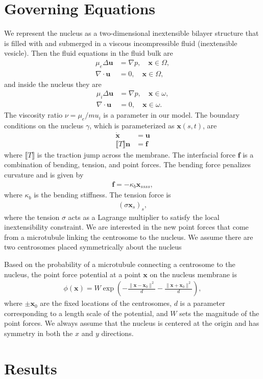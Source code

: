 \documentclass[11pt]{article}
\newcommand{\ff}{\mathbf{f}}
\newcommand{\nn}{\mathbf{n}}
\newcommand{\uu}{\mathbf{u}}
\newcommand{\xx}{\mathbf{x}}
\begin{document}
\section{Governing Equations}
We represent the nucleus as a two-dimensional inextensible bilayer
structure that is filled with and submerged in a viscous incompressible
fluid (inextensible vesicle).  Then the fluid equations in the fluid
bulk are
\begin{align}
  \mu_e \Delta \uu &= \nabla p, \quad \xx \in \Omega, \\
  \nabla \cdot \uu &= 0, \quad \xx \in \Omega,
\end{align}
and inside the nucleus they are
\begin{align}
  \mu_i \Delta \uu &= \nabla p, \quad \xx \in \omega, \\
  \nabla \cdot \uu &= 0, \quad \xx \in \omega.
\end{align}
The viscosity ratio $\nu = \mu_e/mu_i$ is a parameter in our model.  The
boundary conditions on the nucleus $\gamma$, which is parameterized as
$\xx(s,t)$, are 
\begin{align}
  \dot{\xx} &= \uu \\
  \llbracket T \rrbracket \nn &= \ff
\end{align}
where $\llbracket T \rrbracket$ is the traction jump across the
membrane.  The interfacial force $\ff$ is a combination of bending,
tension, and point forces.  The bending force penalizes curvature and is
given by
\begin{align}
  \ff = -\kappa_b \xx_{ssss},
\end{align}
where $\kappa_b$ is the bending stiffness.  The tension force is
\begin{align}
  (\sigma \xx_s)_s,
\end{align}
where the tension $\sigma$ acts as a Lagrange multiplier to satisfy the
local inextensibility constraint.  We are interested in the new point
forces that come from a microtubule linking the centrosome to the
nucleus.  We assume there are two centrosomes placed symmetrically about
the nucleus

Based on the probability of a microtubule connecting a centrosome to the
nucleus, the point force potential at a point $\xx$ on the nucleus
membrane is
\begin{align}
  \phi(\xx) = W\exp\left(-\frac{\|\xx - \xx_0\|^2}{d} 
                         -\frac{\|\xx + \xx_0\|^2}{d}\right),
\end{align}
where $\pm \xx_0$ are the fixed locations of the centrosomes, $d$ is
a parameter corresponding to a length scale of the potential, and $W$
sets the magnitude of the point forces.  We always assume that the
nucleus is centered at the origin and has symmetry in both the $x$ and
$y$ directions.


\section{Results}
\end{document}
